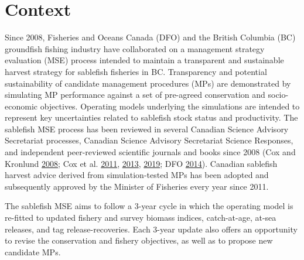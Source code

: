 \documentclass[11pt]{book}
\begin{document}
\MakeFirstPage

\hypertarget{context}{%
\section{Context}\label{context}}

Since 2008, Fisheries and Oceans Canada (DFO) and the British Columbia (BC) groundfish fishing industry have collaborated on a management strategy evaluation (MSE) process intended to maintain a transparent and sustainable harvest strategy for sablefish fisheries in BC. Transparency and potential sustainability of candidate management procedures (MPs) are demonstrated by simulating MP performance against a set of pre-agreed conservation and socio-economic objectives. Operating models underlying the simulations are intended to represent key uncertainties related to sablefish stock status and productivity. The sablefish MSE process has been reviewed in several Canadian Science Advisory Secretariat processes, Canadian Science Advisory Secretariat Science Responses, and independent peer-reviewed scientific journals and books since 2008 (Cox and Kronlund \protect\hyperlink{ref-cox2008practical}{2008}; Cox et al. \protect\hyperlink{ref-cox2011management}{2011}, \protect\hyperlink{ref-cox2013roles}{2013}, \protect\hyperlink{ref-cox2019evaluating}{2019}; DFO \protect\hyperlink{ref-dfo2014performanc}{2014}). Canadian sablefish harvest advice derived from simulation-tested MPs has been adopted and subsequently approved by the Minister of Fisheries every year since 2011.

The sablefish MSE aims to follow a 3-year cycle in which the operating model is re-fitted to updated fishery and survey biomass indices, catch-at-age, at-sea releases, and tag release-recoveries. Each 3-year update also offers an opportunity to revise the conservation and fishery objectives, as well as to propose new candidate MPs.
\end{document}
